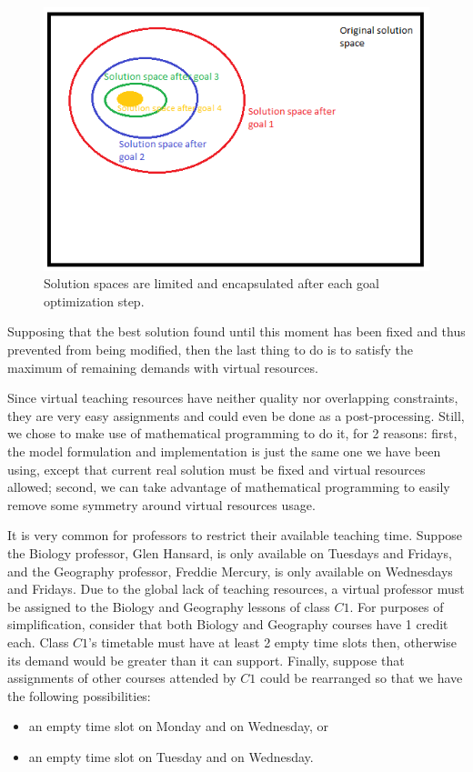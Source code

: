 \begin{figure}[H]
\includegraphics[scale=0.6]{figures/goalProgSpace.png}
\centering
\caption{Solution spaces are limited and encapsulated after each goal optimization step.}
\end{figure}




Supposing that the best solution found until this moment has been fixed and thus prevented from being modified, then the last thing to do is to satisfy the maximum of remaining demands with virtual resources. 

Since virtual teaching resources have neither quality nor overlapping constraints, they are very easy assignments and could even be done as a post-processing. Still, we chose to make use of mathematical programming to do it, for 2 reasons: first, the model formulation and implementation is just the same one we have been using, except that current real solution must be fixed and virtual resources allowed; second, we can take advantage of mathematical programming to easily remove some symmetry around virtual resources usage.

It is very common for professors to restrict their available teaching time. Suppose the Biology professor, Glen Hansard, is only available on Tuesdays and Fridays, and the Geography professor, Freddie Mercury, is only available on Wednesdays and Fridays. Due to the global lack of teaching resources, a virtual professor must be assigned to the Biology and Geography lessons of class $C1$. For purposes of simplification, consider that both Biology and Geography courses have 1 credit each. Class $C1$'s timetable must have at least 2 empty time slots then, otherwise its demand would be greater than it can support. Finally, suppose that assignments of other courses attended by $C1$ could be rearranged so that we have the following possibilities:
\begin{itemize}
\item an empty time slot on Monday and on Wednesday, or
\item an empty time slot on Tuesday and on Wednesday.
\end{itemize}


